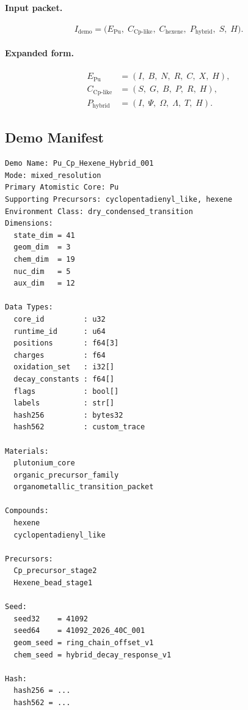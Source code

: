 \documentclass[11pt, a4paper, oneside]{article}
\begin{document}
\paragraph{Input packet.}
\begin{equation}
\label{eq:demo_packet}
I_{\text{demo}} = \bigl(E_{\text{Pu}},\; C_{\text{Cp-like}},\;
  C_{\text{hexene}},\; P_{\text{hybrid}},\; S,\; H\bigr).
\end{equation}

\paragraph{Expanded form.}
\begin{align*}
E_{\text{Pu}}        &= (I,\;B,\;N,\;R,\;C,\;X,\;H),\\
C_{\text{Cp-like}}   &= (S,\;G,\;B,\;P,\;R,\;H),\\
P_{\text{hybrid}}    &= (I,\;\Psi,\;\Omega,\;\Lambda,\;T,\;H).
\end{align*}

\subsection{Demo Manifest}

\begin{lstlisting}[language={}, caption={Integrated demonstration manifest}]
Demo Name: Pu_Cp_Hexene_Hybrid_001
Mode: mixed_resolution
Primary Atomistic Core: Pu
Supporting Precursors: cyclopentadienyl_like, hexene
Environment Class: dry_condensed_transition
Dimensions:
  state_dim = 41
  geom_dim  = 3
  chem_dim  = 19
  nuc_dim   = 5
  aux_dim   = 12

Data Types:
  core_id         : u32
  runtime_id      : u64
  positions       : f64[3]
  charges         : f64
  oxidation_set   : i32[]
  decay_constants : f64[]
  flags           : bool[]
  labels          : str[]
  hash256         : bytes32
  hash562         : custom_trace

Materials:
  plutonium_core
  organic_precursor_family
  organometallic_transition_packet

Compounds:
  hexene
  cyclopentadienyl_like

Precursors:
  Cp_precursor_stage2
  Hexene_bead_stage1

Seed:
  seed32    = 41092
  seed64    = 41092_2026_40C_001
  geom_seed = ring_chain_offset_v1
  chem_seed = hybrid_decay_response_v1

Hash:
  hash256 = ...
  hash562 = ...
\end{lstlisting}
\end{document}
